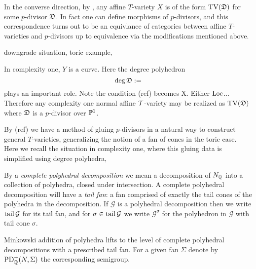 In the converse direction, by \cite[Proposition 3.4]{hausen2018torus}, any affine \(T\)-variety \(X\) is of the form \(\operatorname{TV}({\mathfrak{D}})\) for some \(p\)-divisor \({\mathfrak{D}}\). In fact one can define morphisms of \(p\)-divisors, and this correspondence turns out to be an equivlance of categories between affine \(T\)-varieties and \(p\)-divisors up to equivalence via the modifications mentioned above.
\begin{example}
downgrade situation, toric example,
\end{example}

In complexity one, \(Y\) is a curve. Here the degree polyhedron
\[
\deg {\mathfrak{D}} :=
\]
plays an important role. Note the condition (ref) becomes X. Either \(\operatorname{Loc} \)... Therefore any complexity one normal affine \({\mathcal{T}}\)-variety may be realized as \(\operatorname{TV}({\mathfrak{D}})\) where \({\mathfrak{D}}\) is a \(p\)-divisor over \(\mathbb{P}^1\).

By (ref) we have a method of gluing \(p\)-divisors in a natural way to construct general \(T\)-varieties, generalizing the notion of a fan of cones in the toric case. Here we recall the situation in complexity one, where this gluing data is simplified using degree polyhedra, 

By a \textit{complete polyhedral decomposition} we mean a decomposition of \(N_{\mathbb{Q}}\) into a collection of polyhedra, closed under intersection. A complete polyhedral decomposition will have a \textit{tail fan}: a fan comprised of exactly the tail cones of the polyhedra in the decomposition. If \(\mathcal{G}\) is a polyhedral decomposition then we write \(\operatorname{tail} \mathcal{G}\) for its tail fan, and for \(\sigma \in \operatorname{tail} \mathcal{G}\) we write  \(\mathcal{G}^\sigma\) for the polyhedron in \(\mathcal{G}\) with tail cone \(\sigma\).

Minkowski addition of polyhedra lifts to the level of complete polyhedral decompositions with a prescribed tail fan. For a given fan \(\Sigma\) denote by \(\operatorname{PD}^+_{\mathbb{Q}}(N,\Sigma)\) the corresponding semigroup.

